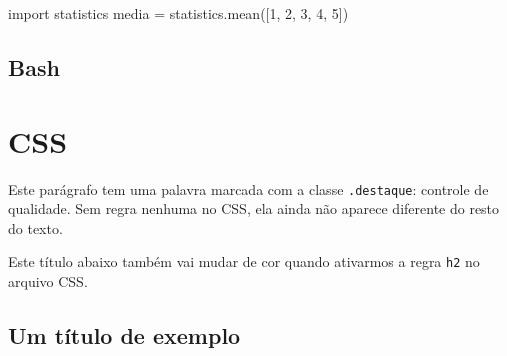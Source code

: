 \documentclass[
  brazilian,
  11pt,
  a4paper,
]{article}
\newenvironment{Shaded}{\begin{snugshade}}{\end{snugshade}}
\newcommand{\DecValTok}[1]{\textcolor[rgb]{0.68,0.00,0.00}{#1}}
\newcommand{\FunctionTok}[1]{\textcolor[rgb]{0.28,0.35,0.67}{#1}}
\newcommand{\ImportTok}[1]{\textcolor[rgb]{0.00,0.46,0.62}{#1}}
\newcommand{\NormalTok}[1]{\textcolor[rgb]{0.00,0.23,0.31}{#1}}
\newcommand{\OperatorTok}[1]{\textcolor[rgb]{0.37,0.37,0.37}{#1}}
\newcommand{\StringTok}[1]{\textcolor[rgb]{0.13,0.47,0.30}{#1}}
\begin{document}
\begin{Shaded}
\begin{Highlighting}[]
\ImportTok{import}\NormalTok{ statistics}
\NormalTok{media }\OperatorTok{=}\NormalTok{ statistics.mean([}\DecValTok{1}\NormalTok{, }\DecValTok{2}\NormalTok{, }\DecValTok{3}\NormalTok{, }\DecValTok{4}\NormalTok{, }\DecValTok{5}\NormalTok{])}
\end{Highlighting}
\end{Shaded}

\subsection{Bash}

\begin{Shaded}
\end{Shaded}

\section{CSS}\label{css}

Este parágrafo tem uma palavra marcada com a classe \texttt{.destaque}:
{controle de qualidade}. Sem regra nenhuma no CSS, ela ainda não aparece
diferente do resto do texto.

Este título abaixo também vai mudar de cor quando ativarmos a regra
\texttt{h2} no arquivo CSS.

\subsection{Um título de exemplo}\label{um-tuxedtulo-de-exemplo}
\end{document}
